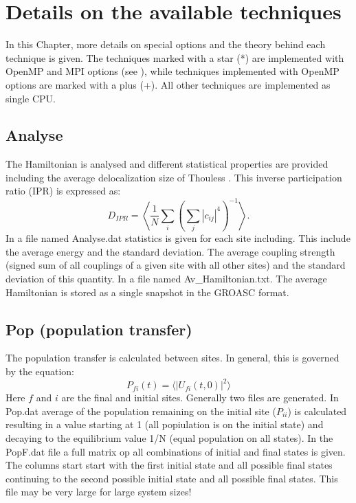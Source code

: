 \chapter{\label{chap:techniques}Details on the available techniques}
In this Chapter, more details on special options and the theory behind each technique is given. The techniques marked with a star (*) are implemented with OpenMP and MPI options (see \cite{Sardjan_2020}), while techniques implemented with OpenMP options are marked with a plus (+). All other techniques are implemented as single CPU. 
\section{Analyse}
The Hamiltonian is analysed and different statistical properties are provided including the average delocalization size of Thouless \cite{Thouless.1974.PR.13.93}. This inverse participation ratio (IPR) is expressed as:
\begin{equation}
	D_{IPR}=\left\langle\frac{1}{N}\sum_i\left(\sum_j |c_{ij}|^{4}\right)^{-1}\right \rangle.
\end{equation}
In a file named Analyse.dat statistics is given for each site including. This include the average energy and the standard deviation. The average coupling strength (signed sum of all couplings of a given site with all other sites) and the standard deviation of this quantity.
In a file named Av\_Hamiltonian.txt. The average Hamiltonian is stored as a single snapshot in the GROASC format.
\section{Pop (population transfer)}
The population transfer is calculated between sites. In general, this is governed by the equation:
\begin{equation}
P_{fi}(t)=\langle |U_{fi}(t,0)|^2 \rangle
\end{equation}
Here $f$ and $i$ are the final and initial sites. Generally two files are generated. In Pop.dat average of the population remaining on the initial site ($P_{ii}$) is calculated resulting in a value starting at 1 (all popiulation is on the initial state) and decaying to the equilibrium value 1/N (equal population on all states). In the PopF.dat file a full matrix op all combinations of initial and final states is given. The columns start start with the first initial state and all possible final states continuing to the second possible initial state and all possible final states. This file may be very large for large system sizes!
